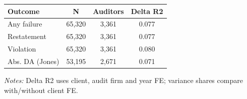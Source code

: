 \documentclass[10pt]{article}
\begin{document}
\begin{minipage}{19cm}\fontsize{10}{12}\selectfont\setlength{\tabcolsep}{4pt}\renewcommand{\arraystretch}{1.12}


\centering
{}
\begin{threeparttable}
\begin{tabular}{p{}ccc}
\toprule
Outcome & N & Auditors & Delta R2 \\
\midrule
Any failure & 65,320 & 3,361 & 0.077 \\
Restatement & 65,320 & 3,361 & 0.077 \\
Violation & 65,320 & 3,361 & 0.080 \\
Abs. DA (Jones) & 53,195 & 2,671 & 0.071 \\
\bottomrule
\end{tabular}
\begin{tablenotes}\fontsize{9}{11}\selectfont
\item \raggedright \fontsize{9}{11}\selectfont \textit{Notes:} Delta R2 uses client, audit firm and year FE; variance shares compare with/without client FE.
\end{tablenotes}
\end{threeparttable}

\end{minipage}
\end{document}
